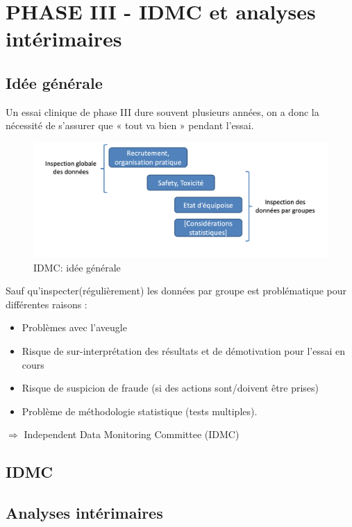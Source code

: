 \chapter{PHASE III - IDMC et analyses intérimaires}

\section{Idée générale}
Un essai clinique de phase III dure souvent plusieurs années, on a donc la nécessité de s’assurer que « tout va bien » pendant l’essai.
\begin{figure}[H]
    \centering
    \includegraphics[scale = 0.4]{images/IDMC.png}
    \caption{IDMC: idée générale}
    \label{fig:IDMC}
\end{figure}
Sauf qu'inspecter(régulièrement) les données par groupe est problématique pour différentes raisons :
\begin{itemize}
    \item Problèmes avec l’aveugle
\item Risque de sur-interprétation des résultats et de démotivation
pour l’essai en cours
\item Risque de suspicion de fraude (si des actions sont/doivent être prises)
\item Problème de méthodologie statistique (tests multiples).
\end{itemize}

\vspace{0.5cm}

\begin{center}
    $\Rightarrow$ Independent Data Monitoring Committee (IDMC)
\end{center}
\section{IDMC}


\section{Analyses intérimaires}

